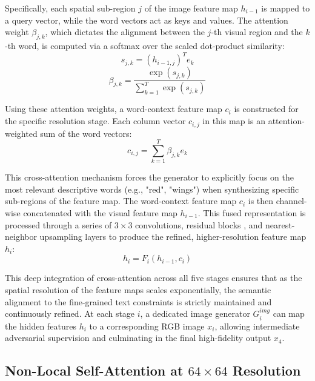 \documentclass[conference]{IEEEtran}
\begin{document}
Specifically, each spatial sub-region $j$ of the image feature map $h_{i-1}$ is mapped to a query vector, while the word vectors act as keys and values. The attention weight $\beta_{j,k}$, which dictates the alignment between the $j$-th visual region and the $k$-th word, is computed via a softmax over the scaled dot-product similarity:
\begin{equation}
    s_{j,k} = (h_{i-1, j})^T e_k
\end{equation}
\begin{equation}
    \beta_{j,k} = \frac{\exp(s_{j,k})}{\sum_{k=1}^{T} \exp(s_{j,k})}
\end{equation}

Using these attention weights, a word-context feature map $c_i$ is constructed for the specific resolution stage. Each column vector $c_{i,j}$ in this map is an attention-weighted sum of the word vectors:
\begin{equation}
    c_{i,j} = \sum_{k=1}^{T} \beta_{j,k} e_k
\end{equation}

This cross-attention mechanism forces the generator to explicitly focus on the most relevant descriptive words (e.g., "red", "wings") when synthesizing specific sub-regions of the feature map. The word-context feature map $c_i$ is then channel-wise concatenated with the visual feature map $h_{i-1}$. This fused representation is processed through a series of $3 \times 3$ convolutions, residual blocks \cite{he2016deep}, and nearest-neighbor upsampling layers to produce the refined, higher-resolution feature map $h_i$:
\begin{equation}
    h_i = F_i(h_{i-1}, c_i)
\end{equation}

This deep integration of cross-attention across all five stages ensures that as the spatial resolution of the feature maps scales exponentially, the semantic alignment to the fine-grained text constraints is strictly maintained and continuously refined. At each stage $i$, a dedicated image generator $G_i^{img}$ can map the hidden features $h_i$ to a corresponding RGB image $x_i$, allowing intermediate adversarial supervision and culminating in the final high-fidelity output $x_4$.

\subsection{Non-Local Self-Attention at $64 \times 64$ Resolution}
\end{document}
